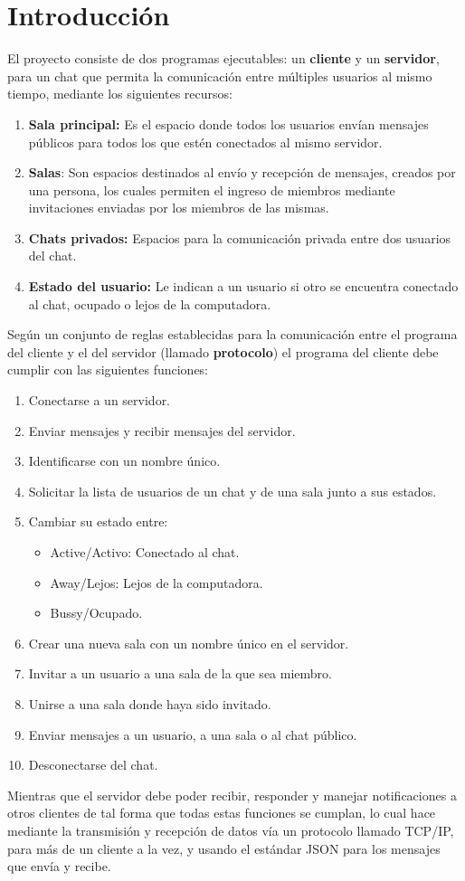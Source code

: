 \chapter{Introducción}

El proyecto consiste de dos programas ejecutables: un \textbf{cliente} y un \textbf{servidor}, para un chat que permita la comunicación entre múltiples usuarios al mismo tiempo, mediante los siguientes recursos:
\begin{enumerate}
	\item \textbf{Sala principal:} Es el espacio donde todos los usuarios envían mensajes públicos para todos los que estén conectados al mismo servidor.
	\item \textbf{Salas}: Son espacios destinados al envío y recepción de mensajes, creados por una persona, los cuales permiten el ingreso de miembros mediante invitaciones enviadas por los miembros de las mismas.
	\item \textbf{Chats privados:} Espacios para la comunicación privada entre dos usuarios del chat.
	\item \textbf{Estado del usuario:} Le indican a un usuario si otro se encuentra conectado al chat, ocupado o lejos de la computadora.
	
\end{enumerate}

Según un conjunto de reglas establecidas para la comunicación entre el programa del cliente y el del servidor (llamado \textbf{protocolo}) el programa del cliente debe cumplir con las siguientes funciones:
\begin{enumerate}
	\item Conectarse a un servidor.
	\item Enviar mensajes y recibir mensajes del servidor.
	\item Identificarse con un nombre único.
	\item Solicitar la lista de usuarios de un chat y de una sala junto a sus estados.
	\item Cambiar su estado entre:
	\begin{itemize}
		\item Active/Activo: Conectado al chat.
		\item Away/Lejos: Lejos de la computadora.
		\item Bussy/Ocupado.
	\end{itemize}
	\item Crear una nueva sala con un nombre único en el servidor.
	\item Invitar a un usuario a una sala de la que sea miembro.
	\item Unirse a una sala donde haya sido invitado.
	\item Enviar mensajes a un usuario, a una sala o al chat público. 
	\item Desconectarse del chat.
\end{enumerate}

Mientras que el servidor debe poder recibir, responder y manejar notificaciones a otros clientes de tal forma que todas estas funciones se cumplan, lo cual hace mediante la transmisión y recepción de datos vía un protocolo llamado TCP/IP, para más de un cliente a la vez, y usando el estándar JSON para los mensajes que envía y recibe.